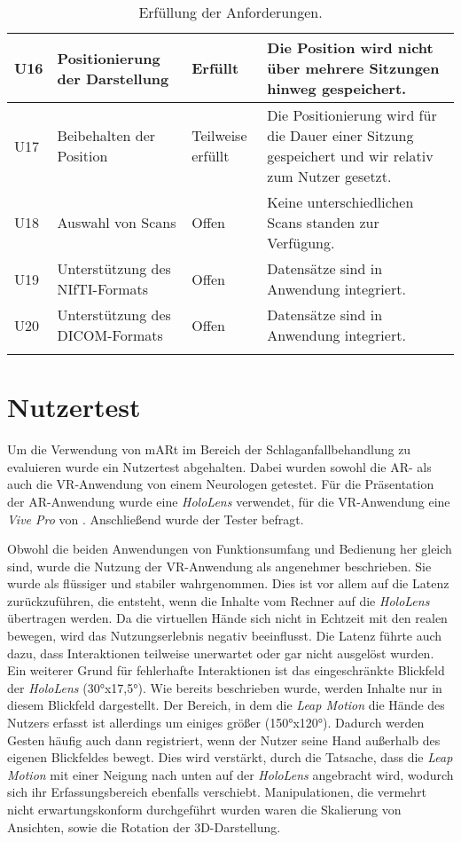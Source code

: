\begin{longtable} {p{}p{}p{}p{}}
\midrule 
U16 & Positionierung der Darstellung & Erfüllt & Die Position wird nicht über mehrere Sitzungen hinweg gespeichert.\\
\midrule 
U17 & Beibehalten der Position & Teilweise erfüllt & Die Positionierung wird für die Dauer einer Sitzung gespeichert und wir relativ zum Nutzer gesetzt.\\
\midrule 
U18 & Auswahl von Scans & Offen & Keine unterschiedlichen Scans standen zur Verfügung.\\
\midrule 
U19 & Unterstützung des NIfTI-Formats & Offen & Datensätze sind in Anwendung integriert.\\
\midrule 
U20 & Unterstützung des DICOM-Formats & Offen & Datensätze sind in Anwendung integriert.\\

\bottomrule
\caption{\label{tab:evaluation}Erfüllung der Anforderungen.}
\end{longtable}

\section{Nutzertest}
\label{nazuertest}

Um die Verwendung von mARt im Bereich der Schlaganfallbehandlung zu evaluieren wurde ein Nutzertest abgehalten. 
Dabei wurden sowohl die AR- als auch die VR-Anwendung von einem Neurologen getestet. Für die Präsentation der AR-Anwendung wurde eine \textit{HoloLens} verwendet, für die VR-Anwendung eine \textit{Vive Pro} von \cite{vivePro}. Anschließend wurde der Tester befragt.

Obwohl die beiden Anwendungen von Funktionsumfang und Bedienung her gleich sind, wurde die Nutzung der VR-Anwendung als angenehmer beschrieben. 
Sie wurde als flüssiger und stabiler wahrgenommen. 
Dies ist vor allem auf die Latenz zurückzuführen, die entsteht, wenn die Inhalte vom Rechner auf die \textit{HoloLens} übertragen werden. Da die virtuellen Hände sich nicht in Echtzeit mit den realen bewegen, wird das Nutzungserlebnis negativ beeinflusst. 
Die Latenz führte auch dazu, dass Interaktionen teilweise unerwartet oder gar nicht ausgelöst wurden. 
Ein weiterer Grund für fehlerhafte Interaktionen ist das eingeschränkte Blickfeld der \textit{HoloLens} (30°x17,5°). Wie bereits beschrieben wurde, werden Inhalte nur in diesem Blickfeld dargestellt. Der Bereich, in dem die \textit{Leap Motion} die Hände des Nutzers erfasst ist allerdings um einiges größer (150°x120°). Dadurch werden Gesten häufig auch dann registriert, wenn der Nutzer seine Hand außerhalb des eigenen Blickfeldes bewegt. Dies wird verstärkt, durch die Tatsache, dass die \textit{Leap Motion} mit einer Neigung nach unten auf der \textit{HoloLens} angebracht wird, wodurch sich ihr Erfassungsbereich ebenfalls verschiebt.
Manipulationen, die vermehrt nicht erwartungskonform durchgeführt wurden waren die Skalierung von Ansichten, sowie die Rotation der 3D-Darstellung.

